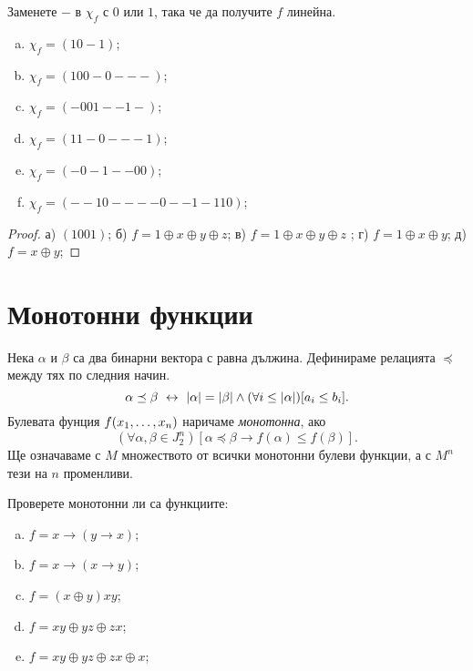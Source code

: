 \begin{problem}
  Заменете $-$ в $\chi_f$ с $0$ или $1$, така че да получите $f$ линейна.
  \begin{enumerate}[a)]
  \item
    $\chi_f = (10-1)$;
  \item
    $\chi_f = (100-0---)$;
  \item
    $\chi_f = (-001--1-)$;
  \item
    $\chi_f = (11-0---1)$;
  \item
    $\chi_f = (-0-1--00)$;
  \item
    $\chi_f = (--10----0--1-110)$;
  \end{enumerate}
\end{problem}
\begin{proof}
  а) $(1001)$; б) $f = 1\oplus x \oplus y\oplus z$; в) $f = 1\oplus x\oplus y\oplus z$ ;
  г) $f = 1\oplus x\oplus y$; д) $f = x\oplus y$;
\end{proof}


\section{Монотонни функции}

Нека $\alpha$ и $\beta$ са два бинарни вектора с равна дължина.
Дефинираме релацията $\preceq$ между тях по следния начин.
\[\alpha \preceq \beta \ \leftrightarrow\  \vert{\alpha}\vert = \vert{\beta}\vert\wedge (\forall i \leq \vert{\alpha}\vert)[a_i \leq b_i].\]
Булевата фунция $f(x_{1},\dots,x_{n})$ наричаме {\em монотонна}, ако 
\[(\forall \alpha,\beta\in J^n_2 )[\alpha\preceq\beta \rightarrow f(\alpha) \leq f(\beta)].\]
Ще означаваме с $M$ множеството от всички монотонни булеви функции, а с $M^n$ тези на $n$ променливи.

\begin{problem}
  Проверете монотонни ли са функциите:\\
  \begin{enumerate}[a)]
  \item
    $f = x\rightarrow (y\rightarrow x)$;
  \item
    $f = x\rightarrow (x\rightarrow y)$;
  \item
    $f = (x\oplus y)xy$;
  \item
    $f = xy\oplus yz \oplus zx$;
  \item
    $f = xy\oplus yz \oplus zx \oplus x$;
  \end{enumerate}
\end{problem}

